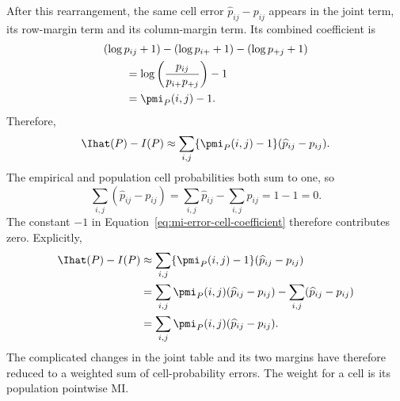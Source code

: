 After this rearrangement, the same cell error \(\widehat p_{ij}-p_{ij}\)
appears in the joint term, its
row-margin term and its column-margin term. Its combined coefficient is
\begin{align}
  &(\log p_{ij}+1)
  -(\log p_{i+}+1)
  -(\log p_{+j}+1)
  \notag\\
  &\qquad
  =\log\left(\frac{p_{ij}}{p_{i+}p_{+j}}\right)-1
  \notag\\
  &\qquad
  =\pmi_P(i,j)-1.
  \label{eq:mi-error-cell-coefficient}
\end{align}
Therefore,
\begin{equation}
  \Ihat(P)-I(P)
  \approx
  \sum_{i,j}\{\pmi_P(i,j)-1\}(\widehat p_{ij}-p_{ij}).
  \label{eq:mi-error-before-constant-cancellation}
\end{equation}
The empirical and population cell probabilities both sum to one, so
\begin{equation}
  \sum_{i,j}(\widehat p_{ij}-p_{ij})
  =\sum_{i,j}\widehat p_{ij}-\sum_{i,j}p_{ij}
  =1-1=0.
  \label{eq:cell-errors-sum-zero}
\end{equation}
The constant \(-1\) in Equation~\eqref{eq:mi-error-cell-coefficient} therefore
contributes zero. Explicitly,
\begin{align}
  \Ihat(P)-I(P)
  &\approx
  \sum_{i,j}\{\pmi_P(i,j)-1\}(\widehat p_{ij}-p_{ij})
  \notag\\
  &=\sum_{i,j}\pmi_P(i,j)(\widehat p_{ij}-p_{ij})
    -\sum_{i,j}(\widehat p_{ij}-p_{ij})
  \notag\\
  &=\sum_{i,j}
  \pmi_P(i,j)(\widehat p_{ij}-p_{ij}).
  \label{eq:mi-error-from-cell-errors}
\end{align}
The complicated changes in the joint table and its two margins have therefore
reduced to a weighted sum of cell-probability errors. The weight for a cell is
its population pointwise MI.

\medskip
{}

